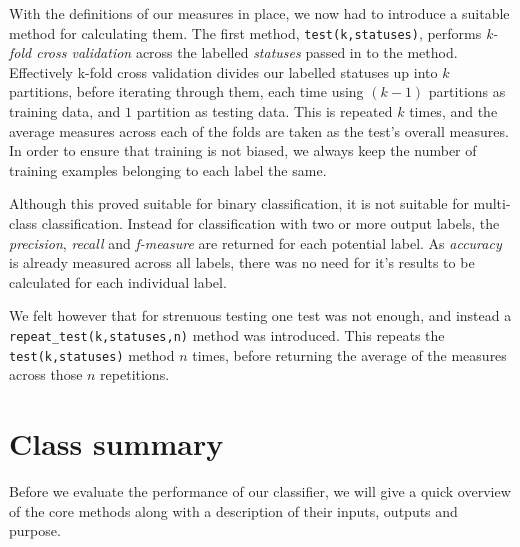 With the definitions of our measures in place, we now had to introduce a suitable method for calculating them. The first method, \texttt{test(k,statuses)}, performs \emph{k-fold cross validation} across the labelled \emph{statuses} passed in to the method. Effectively k-fold cross validation divides our labelled statuses up into $k$ partitions, before iterating through them, each time using $(k-1)$ partitions as training data, and $1$ partition as testing data. This is repeated $k$ times, and the average measures across each of the folds are taken as the test's overall measures. In order to ensure that training is not biased, we always keep the number of training examples belonging to each label the same.

Although this proved suitable for binary classification, it is not suitable for multi-class classification. Instead for classification with two or more output labels, the \emph{precision}, \emph{recall} and \emph{f-measure} are returned for each potential label. As \emph{accuracy} is already measured across all labels, there was no need for it's results to be calculated for each individual label.

We felt however that for strenuous testing one test was not enough, and instead a \texttt{repeat\_test(k,statuses,n)} method was introduced. This repeats the \texttt{test(k,statuses)} method $n$ times, before returning the average of the measures across those $n$ repetitions.

\section{Class summary}

Before we evaluate the performance of our classifier, we will give a quick overview of the core methods along with a description of their inputs, outputs and purpose.

